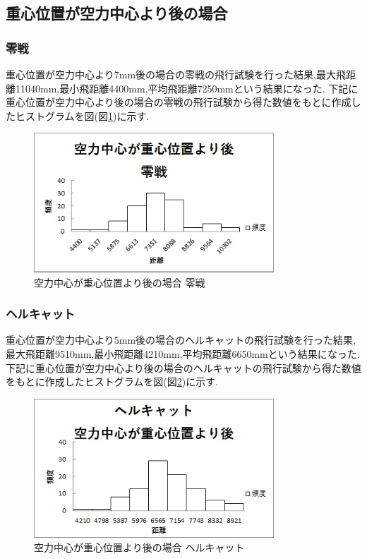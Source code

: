 \subsection{重心位置が空力中心より後の場合}

\subsubsection{零戦}
重心位置が空力中心より7mm後の場合の零戦の飛行試験を行った結果,最大飛距離11040mm,最小飛距離4400mm,平均飛距離7250mmという結果になった.
下記に重心位置が空力中心より後の場合の零戦の飛行試験から得た数値をもとに作成したヒストグラムを図(図\ref{fig:zu})に示す.

\begin{figure}[htbp]
  \begin{center}
    \includegraphics[width=90mm]{zu.JPG}
    \end{center}
  \caption{空力中心が重心位置より後の場合 零戦}
 \label{fig:zu}
\end{figure}

\subsubsection{ヘルキャット}
重心位置が空力中心より5mm後の場合のヘルキャットの飛行試験を行った結果,最大飛距離9510mm,最小飛距離4210mm,平均飛距離6650mmという結果になった.
下記に重心位置が空力中心より後の場合のヘルキャットの飛行試験から得た数値をもとに作成したヒストグラムを図(図\ref{fig:gu})に示す.

\begin{figure}[htbp]
  \begin{center}
    \includegraphics[width=90mm]{gu.JPG}
    \end{center}
  \caption{空力中心が重心位置より後の場合 ヘルキャット}
 \label{fig:gu}
\end{figure}

